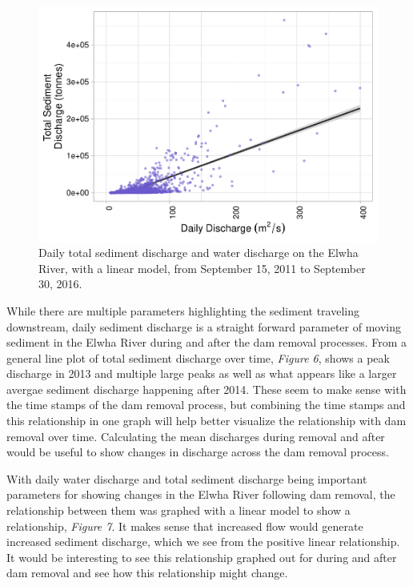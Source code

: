 \documentclass[12pt,]{article}
\begin{document}
\begin{figure}
\centering
\includegraphics{Mason_ENV872_ProjectFinal_files/figure-latex/Exploratory Analysis Figure 7-1.pdf}
\caption{Daily total sediment discharge and water discharge on the Elwha
River, with a linear model, from September 15, 2011 to September 30,
2016.}
\end{figure}

While there are multiple parameters highlighting the sediment traveling
downstream, daily sediment discharge is a straight forward parameter of
moving sediment in the Elwha River during and after the dam removal
processes. From a general line plot of total sediment discharge over
time, \emph{Figure 6}, shows a peak discharge in 2013 and multiple large
peaks as well as what appears like a larger avergae sediment discharge
happening after 2014. These seem to make sense with the time stamps of
the dam removal process, but combining the time stamps and this
relationship in one graph will help better visualize the relationship
with dam removal over time. Calculating the mean discharges during
removal and after would be useful to show changes in discharge across
the dam removal process.

With daily water discharge and total sediment discharge being important
parameters for showing changes in the Elwha River following dam removal,
the relationship between them was graphed with a linear model to show a
relationship, \emph{Figure 7}. It makes sense that increased flow would
generate increased sediment discharge, which we see from the positive
linear relationship. It would be interesting to see this relationship
graphed out for during and after dam removal and see how this
relationship might change.
\end{document}
